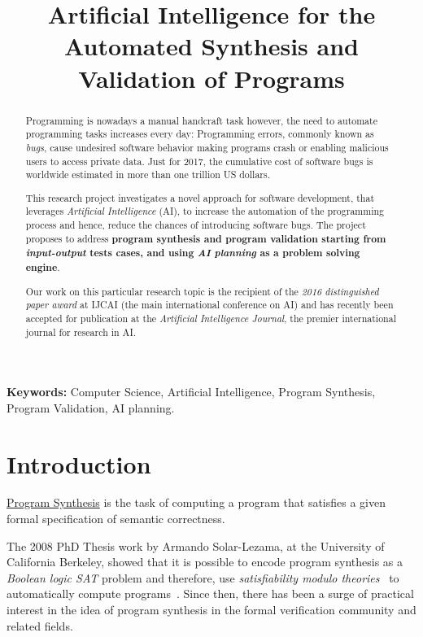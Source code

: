\documentclass[10pt,a4paper]{paper}
\title{Artificial Intelligence for the Automated Synthesis and Validation of Programs}
\begin{document}
\maketitle

\begin{abstract}
  Programming is nowadays a manual handcraft task however, the need to automate programming tasks increases every day: Programming errors, commonly known as {\em bugs}, cause undesired software behavior making programs crash or enabling malicious users to access private data. Just for 2017, the cumulative cost of software bugs is worldwide estimated in more than one trillion US dollars. 

  This research project investigates a novel approach for software development, that leverages {\em Artificial Intelligence} (AI), to increase the automation of the programming process and hence, reduce the chances of introducing software bugs. The project proposes to address {\bf program synthesis and program validation starting from {\em input-output} tests cases, and using {\em AI planning} as a problem solving engine}.

  Our work on this particular research topic is the recipient of the {\em 2016 distinguished paper award} at {\sc IJCAI} (the main international conference on AI) and has recently been accepted for publication at the {\em Artificial Intelligence Journal}, the premier international journal for research in AI. 

\end{abstract}
{\footnotesize {\bf Keywords:} Computer Science, Artificial Intelligence, Program Synthesis, Program Validation, AI planning.}



\section{Introduction}
\label{sec:introduction}

{\underline{Program Synthesis}} is the task of computing a program that satisfies a given formal specification of semantic correctness.

The 2008 PhD Thesis work by Armando Solar-Lezama, at the University of California Berkeley, showed that it is possible to encode program synthesis as a {\em Boolean logic SAT} problem and therefore, use {\em satisfiability modulo theories}~\cite{barrett:SMT:2009} to automatically compute programs~\cite{lezama2008program}. Since then, there has been a surge of practical interest in the idea of program synthesis in the formal verification community and related fields.
\end{document}
